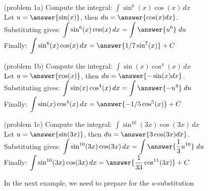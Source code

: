 \documentclass{ximera}
\begin{document}
\begin{problem}(problem 1a)
Compute the integral: $\displaystyle{\int \sin^6(x)\cos(x) \, dx}$\\
Let $u = \answer{\sin(x)}$, \; then $du = \answer{\cos(x) dx}$.\\
Substituting gives: $\displaystyle{\int \sin^6(x)\cos(x) \, dx = \int \answer{u^6} \; du}$\\
Finally: $\displaystyle{\int \sin^{6}(x)\cos(x) \, dx = \answer{1/7 \sin^7(x)} + C}$\\
\end{problem}


\begin{problem}(problem 1b)
Compute the integral: $\displaystyle{\int \sin(x)\cos^4(x) \, dx}$\\
Let $u = \answer{\cos(x)}$, \; then $du = \answer{-\sin(x) dx}$.\\
Substituting gives: $\displaystyle{\int \sin(x)\cos^4(x) \, dx = \int \answer{-u^4} \; du}$\\
Finally: $\displaystyle{\int \sin(x)\cos^4(x) \, dx = \answer{-1/5 \cos^5(x)} + C}$\\
\end{problem}


\begin{problem}(problem 1c)
Compute the integral: $\displaystyle{\int \sin^{10}(3x)\cos(3x) \, dx}$\\
Let $u = \answer{\sin(3x)}$, \; then $du = \answer{3\cos(3x) dx}$.\\
Substituting gives: $\displaystyle{\int \sin^{10}(3x)\cos(3x) \, dx = \int \answer{\frac13 u^{10}} \; du}$\\
Finally: $\displaystyle{\int \sin^{10}(3x)\cos(3x) \, dx = \answer{\frac{1}{33} \cos^{11}(3x)} + C}$\\
\end{problem}


In the next example, we need to prepare for the $u$-substitution 
\end{document}
